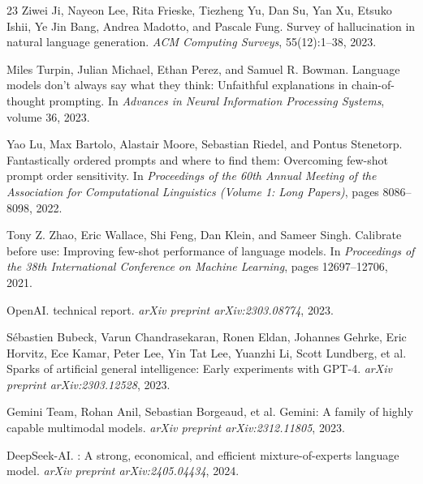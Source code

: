 \begin{thebibliography}{23}
Ziwei Ji, Nayeon Lee, Rita Frieske, Tiezheng Yu, Dan Su, Yan Xu, Etsuko Ishii, Ye Jin Bang, Andrea Madotto, and Pascale Fung.
\newblock Survey of hallucination in natural language generation.
\newblock \emph{ACM Computing Surveys}, 55(12):1--38, 2023.

Miles Turpin, Julian Michael, Ethan Perez, and Samuel R. Bowman.
\newblock Language models don't always say what they think: Unfaithful explanations in chain-of-thought prompting.
\newblock In \emph{Advances in Neural Information Processing Systems}, volume 36, 2023.

Yao Lu, Max Bartolo, Alastair Moore, Sebastian Riedel, and Pontus Stenetorp.
\newblock Fantastically ordered prompts and where to find them: Overcoming few-shot prompt order sensitivity.
\newblock In \emph{Proceedings of the 60th Annual Meeting of the Association for Computational Linguistics (Volume 1: Long Papers)}, pages 8086--8098, 2022.

Tony Z. Zhao, Eric Wallace, Shi Feng, Dan Klein, and Sameer Singh.
\newblock Calibrate before use: Improving few-shot performance of language models.
\newblock In \emph{Proceedings of the 38th International Conference on Machine Learning}, pages 12697--12706, 2021.

OpenAI.
 technical report.
\newblock \emph{arXiv preprint arXiv:2303.08774}, 2023.

S{\'e}bastien Bubeck, Varun Chandrasekaran, Ronen Eldan, Johannes Gehrke, Eric Horvitz, Ece Kamar, Peter Lee, Yin Tat Lee, Yuanzhi Li, Scott Lundberg, et al.
\newblock Sparks of artificial general intelligence: Early experiments with {GPT-4}.
\newblock \emph{arXiv preprint arXiv:2303.12528}, 2023.

{Gemini Team}, Rohan Anil, Sebastian Borgeaud, et al.
\newblock Gemini: A family of highly capable multimodal models.
\newblock \emph{arXiv preprint arXiv:2312.11805}, 2023.

{DeepSeek-AI}.
: A strong, economical, and efficient mixture-of-experts language model.
\newblock \emph{arXiv preprint arXiv:2405.04434}, 2024.

\end{thebibliography}
